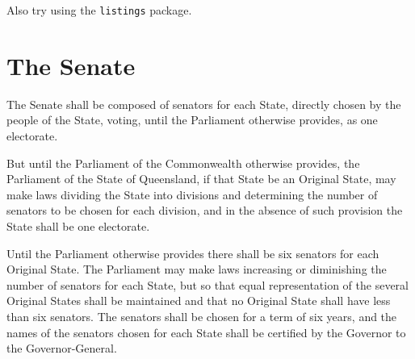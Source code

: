 \documentclass[11pt]{article}
\begin{document}
Also try using the \texttt{listings} package.


\appendix
\section{The Senate}
The Senate shall be composed of senators for each State, directly chosen by the people of the State, voting, until the Parliament otherwise provides, as one electorate.

But until the Parliament of the Commonwealth otherwise provides, the Parliament of the State of Queensland, if that State be an Original State, may make laws dividing the State into divisions and determining the number of senators to be chosen for each division, and in the absence of such provision the State shall be one electorate.

Until the Parliament otherwise provides there shall be six senators for each Original State. The Parliament may make laws increasing or diminishing the number of senators for each State, but so that equal representation of the several Original States shall be maintained and that no Original State shall have less than six senators. The senators shall be chosen for a term of six years, and the names of the senators chosen for each State shall be certified by the Governor to the Governor-General.
\end{document}
